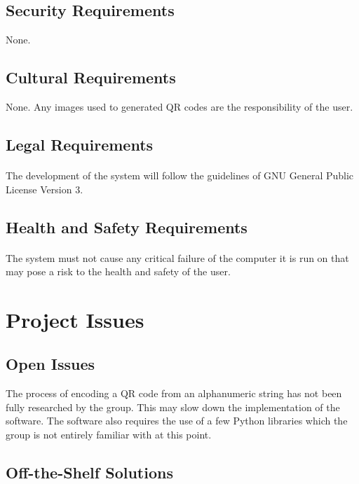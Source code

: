 \documentclass[12pt, titlepage]{article}
\begin{document}
\subsection{Security Requirements}

	None.

\subsection{Cultural Requirements}

	None. Any images used to generated QR codes are the responsibility of the 
	user.

\subsection{Legal Requirements}

	\paragraph{}
	The development of the system will follow the guidelines of GNU General 
	Public License Version 3.

\subsection{Health and Safety Requirements}

	\paragraph{}
	The system must not cause any critical failure of the computer it is run on 
	that may pose a risk to the health and safety of the user.

\section{Project Issues}

\subsection{Open Issues}

	The process of encoding a QR code from an alphanumeric string has not been 
	fully researched by the group. This may slow down the implementation of the 
	software. The software also requires the use of a few Python libraries 
	which the group is not entirely familiar with at this point.

\subsection{Off-the-Shelf Solutions}
\end{document}
